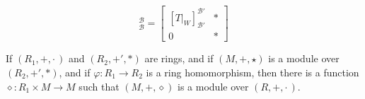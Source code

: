     \begin{equation}
        [T]_{\mathscr{B}}^{\mathscr{B}}=
        \begin{bmatrix}
            [T|_{W}]_{\mathscr{B}'}^{\mathscr{B}'}&*\\
            0&*
        \end{bmatrix}
    \end{equation}
    \begin{theorem}
        If $(R_{1},+,\cdot\,)$ and $(R_{2},+',*)$ are rings, and if
        $(M,\boldsymbol{+},\star)$ is a module over $(R_{2},+',*)$, and if
        $\varphi:R_{1}\rightarrow{R}_{2}$ is a ring homomorphism, then
        there is a function $\diamond:R_{1}\times{M}\rightarrow{M}$ such that
        $(M,\boldsymbol{+},\diamond)$ is a module over $(R,+,\cdot\,)$.
    \end{theorem}
